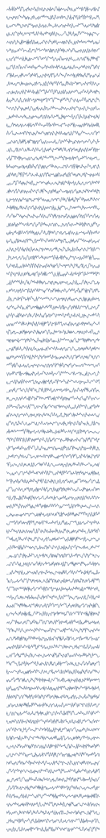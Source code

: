 \documentclass[oneside,12pt]{amsart}
\theoremstyle{definition}
\numberwithin{equation}{section}
\begin{document}
\begin{figure}[!htb]
{      \includegraphics[width=0.18\linewidth]{./charts/varying-patterns-v2.png}}
      \label{fig:patterns}
\end{figure}

\end{document}
